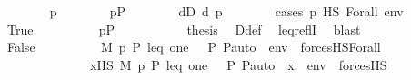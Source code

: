 \begin{isabellebody}
\isanewline
\ \ \ \ \ \ \isamarkupfalse%
\ p\isanewline
\ \ \ \ \ \ \isamarkupfalse%
\ {\isachardoublequoteopen}p{\isasymin}P{\isachardoublequoteclose}\isanewline
\ \ \ \ \ \ \isamarkupfalse%
\ {\isachardoublequoteopen}{\isasymexists}d{\isasymin}D{\isachardot}{\kern0pt}\ d{\isasympreceq}\ p{\isachardoublequoteclose}\isanewline
\ \ \ \ \ \ \isamarkupfalse%
\ {\isacharparenleft}{\kern0pt}cases\ {\isachardoublequoteopen}p\ {\isasymtturnstile}HS\ Forall{\isacharparenleft}{\kern0pt}{\isasymphi}{\isacharparenright}{\kern0pt}\ env{\isachardoublequoteclose}{\isacharparenright}{\kern0pt}\isanewline
\ \ \ \ \ \ \ \ \isamarkupfalse%
\ True\isanewline
\ \ \ \ \ \ \ \ \isamarkupfalse%
\ {\isacartoucheopen}p{\isasymin}P{\isacartoucheclose}\ \isanewline
\ \ \ \ \ \ \ \ \isamarkupfalse%
\ {\isacharquery}{\kern0pt}thesis\ \isamarkupfalse%
\ D{\isacharunderscore}{\kern0pt}def\ \isamarkupfalse%
\ leq{\isacharunderscore}{\kern0pt}reflI\ \isamarkupfalse%
\ blast\isanewline
\ \ \ \ \ \ \isamarkupfalse%
\isanewline
\ \ \ \ \ \ \ \ \isamarkupfalse%
\ False\isanewline
\isanewline
\ \ \ \ \ \ \ \ \isamarkupfalse%
\ {\isachardoublequoteopen}{\isacharparenleft}{\kern0pt}M{\isacharcomma}{\kern0pt}\ {\isacharbrackleft}{\kern0pt}p{\isacharcomma}{\kern0pt}\ P{\isacharcomma}{\kern0pt}\ leq{\isacharcomma}{\kern0pt}\ one{\isacharcomma}{\kern0pt}\ {\isasymlangle}{\isasymF}{\isacharcomma}{\kern0pt}\ {\isasymG}{\isacharcomma}{\kern0pt}\ P{\isacharcomma}{\kern0pt}\ P{\isacharunderscore}{\kern0pt}auto{\isasymrangle}{\isacharbrackright}{\kern0pt}\ {\isacharat}{\kern0pt}\ env\ {\isasymTurnstile}\ forcesHS{\isacharparenleft}{\kern0pt}Forall{\isacharparenleft}{\kern0pt}{\isasymphi}{\isacharparenright}{\kern0pt}{\isacharparenright}{\kern0pt}{\isacharparenright}{\kern0pt}\ {\isasymlongleftrightarrow}\ \isanewline
\ \ \ \ \ \ \ \ \ \ \ \ \ \ {\isacharparenleft}{\kern0pt}{\isasymforall}x{\isasymin}HS{\isachardot}{\kern0pt}\ M{\isacharcomma}{\kern0pt}\ {\isacharbrackleft}{\kern0pt}p{\isacharcomma}{\kern0pt}\ P{\isacharcomma}{\kern0pt}\ leq{\isacharcomma}{\kern0pt}\ one{\isacharcomma}{\kern0pt}\ {\isasymlangle}{\isasymF}{\isacharcomma}{\kern0pt}\ {\isasymG}{\isacharcomma}{\kern0pt}\ P{\isacharcomma}{\kern0pt}\ P{\isacharunderscore}{\kern0pt}auto{\isasymrangle}{\isacharbrackright}{\kern0pt}\ {\isacharat}{\kern0pt}\ {\isacharbrackleft}{\kern0pt}x{\isacharbrackright}{\kern0pt}\ {\isacharat}{\kern0pt}\ env\ {\isasymTurnstile}\ forcesHS{\isacharparenleft}{\kern0pt}{\isasymphi}{\isacharparenright}{\kern0pt}{\isacharparenright}{\kern0pt}{\isachardoublequoteclose}\ \isanewline

\end{isabellebody}
